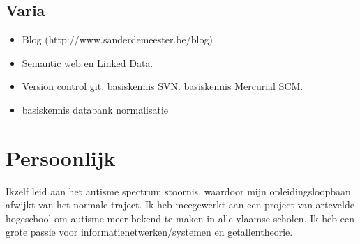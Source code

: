 \documentclass{tccv}
\begin{document}
\subsection{Varia}
\begin{itemize}
\item Blog (http://www.sanderdemeester.be/blog)
\item Semantic web en Linked Data.
\item Version control
\subitem git.
\subitem basiskennis SVN.
\subitem basiskennis Mercurial SCM.
\item basiskennis databank normalisatie
\end{itemize}
\section{Persoonlijk}
Ikzelf leid aan het autisme spectrum stoornis, waardoor mijn opleidingsloopbaan afwijkt van het normale traject. Ik heb meegewerkt aan een project van artevelde hogeschool om autisme meer bekend te maken in alle vlaamse scholen. Ik heb een grote passie voor informatienetwerken/systemen en getallentheorie.
\end{document}
